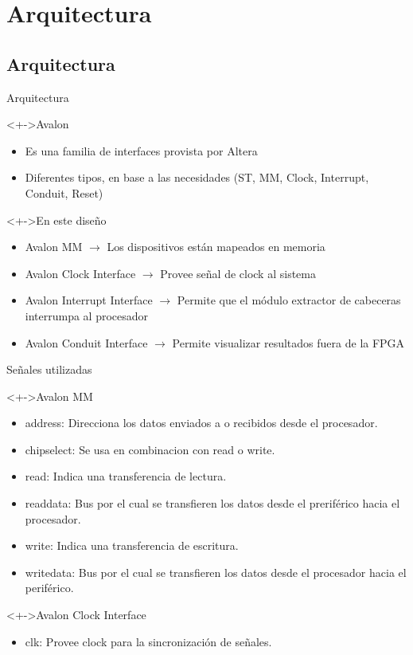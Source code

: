 \documentclass[xcolor=dvipsnames]{beamer}
\begin{document}
\section{Arquitectura}

\subsection{Arquitectura}
\begin{frame}{Arquitectura}
  \begin{block}<+->{Avalon}   
    \begin{itemize}
      \scriptsize
     	\item Es una familia de interfaces provista por Altera
	\item Diferentes tipos, en base a las necesidades (ST, MM, Clock, Interrupt, Conduit, Reset)
    \end{itemize}
  \end{block}
\begin{block}<+->{En este diseño}   
    \begin{itemize}
      \scriptsize
     	\item Avalon MM $\rightarrow$ Los dispositivos están mapeados en memoria
	\item Avalon Clock Interface $\rightarrow$ Provee señal de clock al sistema
	\item Avalon Interrupt Interface $\rightarrow$ Permite que el módulo extractor de cabeceras interrumpa al procesador
	\item Avalon Conduit Interface $\rightarrow$ Permite visualizar resultados fuera de la FPGA
    \end{itemize}
  \end{block}
\end{frame}

\begin{frame}{Señales utilizadas}
  \begin{block}<+->{Avalon MM}
  \begin{itemize}
      \scriptsize
	\item address: Direcciona los datos enviados a o recibidos desde el procesador.
	\item chipselect: Se usa en combinacion con read o write.
	\item read: Indica una transferencia de lectura.
	\item readdata: Bus por el cual se transfieren los datos desde el preriférico hacia el procesador.
	\item write: Indica una transferencia de escritura.
	\item writedata: Bus por el cual se transfieren los datos desde el procesador hacia el periférico.
   \end{itemize}
\end{block}	

\begin{block}<+->{Avalon Clock Interface}
  \begin{itemize}
      \scriptsize
	\item clk: Provee clock para la sincronización de señales.	
   \end{itemize}
  \end{block}
\end{frame}
\end{document}
